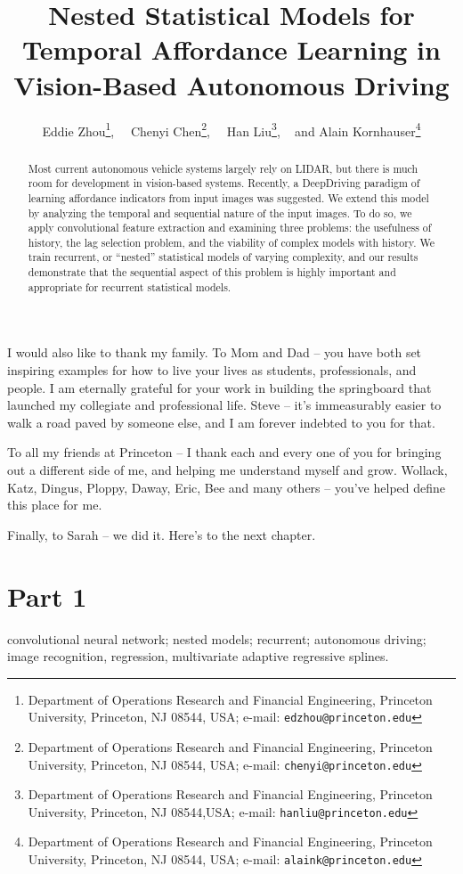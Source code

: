 \documentclass[11pt]{article}
\begin{document}
\begin{titlepage}
\begin{minipage}{\textwidth}
I would also like to thank my family.  To Mom and Dad -- you have both set inspiring examples for how to live your lives as students, professionals, and people.  I am eternally grateful for your work in building the springboard that launched my collegiate and professional life.  Steve -- it's immeasurably easier to walk a road paved by someone else, and I am forever indebted to you for that.

To all my friends at Princeton -- I thank each and every one of you for bringing out a different side of me, and helping me understand myself and grow.  Wollack, Katz, Dingus, Ploppy, Daway, Eric, Bee and many others -- you've helped define this place for me.

Finally, to Sarah -- we did it.  Here's to the next chapter.
\end{minipage}

\end{titlepage}
\chapter{Part 1}
\title{\huge Nested Statistical Models for Temporal Affordance Learning in Vision-Based Autonomous Driving}
\author{
Eddie Zhou\thanks{Department of Operations Research and Financial Engineering, Princeton University, Princeton, NJ 08544, USA; e-mail: {\tt edzhou@princeton.edu}},~~
Chenyi Chen\thanks{Department of Operations Research and Financial Engineering, Princeton University, Princeton, NJ 08544, USA; e-mail: {\tt chenyi@princeton.edu}},~~
Han Liu\thanks{Department of Operations Research and Financial Engineering, Princeton University, Princeton, NJ 08544,USA; e-mail: {\tt hanliu@princeton.edu}}, ~ and
Alain Kornhauser\thanks{Department of Operations Research and Financial Engineering, Princeton University, Princeton, NJ 08544, USA; e-mail: {\tt alaink@princeton.edu}}
}
\date{}
\maketitle
\begin{abstract}
Most current autonomous vehicle systems largely rely on LIDAR, but there is much room for development in vision-based systems.  Recently, a DeepDriving paradigm of learning affordance indicators from input images was suggested.  We extend this model by analyzing the temporal and sequential nature of the input images.  To do so, we apply convolutional feature extraction and examining three problems: the usefulness of history, the lag selection problem, and the viability of complex models with history.  We train recurrent, or ``nested'' statistical models of varying complexity, and our results demonstrate that the sequential aspect of this problem is highly important and appropriate for recurrent statistical models.
\end{abstract}
\vspace{1em}
 convolutional neural network; nested models; recurrent; autonomous driving; image recognition, regression, multivariate adaptive regressive splines.
\end{document}
